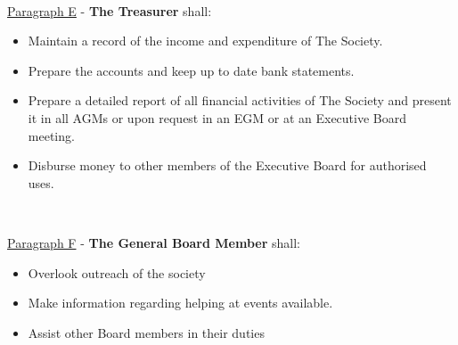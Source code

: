 ~

\underline{Paragraph E} - \textbf{The Treasurer} shall:

\begin{itemize}

    \item{Maintain a record of the income and expenditure of The Society.}

    \item{Prepare the accounts and keep up to date bank statements.}

    \item{Prepare a detailed report of all financial activities of The Society and present it in all AGMs or upon request in an EGM or at an Executive Board meeting.}

    \item{Disburse money to other members of the Executive Board for authorised uses.}

\end{itemize}

~

\underline{Paragraph F} - \textbf{The General Board Member}
shall:

\begin{itemize}

    \item{Overlook outreach of the society}

    \item{Make information regarding helping at events available.}

    \item{Assist other Board members in their duties}

\end{itemize}
